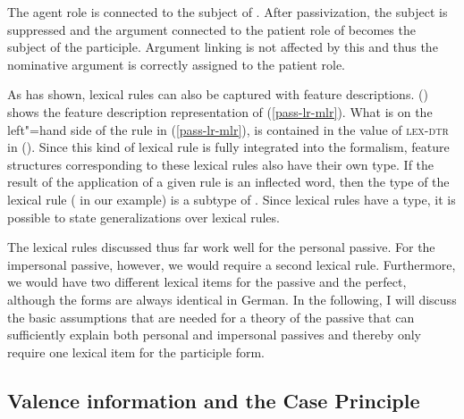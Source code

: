 \zl
The agent role is connected to the subject of . After passivization, the subject is suppressed and the argument connected to
the patient role of  becomes the subject of the participle. Argument linking is not affected by this and thus the nominative argument is
correctly assigned to the patient role.

As \citet{Meurers2001a} has shown, lexical rules can also be captured with feature
descriptions.\label{pageref-lr-mit-dtr} () shows the feature description representation of (\ref{pass-lr-mlr}).
\ea
\label{passiv-lr-mit-dtr}
\z
What is on the left"=hand side of the rule in (\ref{pass-lr-mlr}), is contained in the value of \textsc{lex-dtr} in ().
Since this kind of lexical rule is fully integrated into the formalism, feature structures corresponding to these lexical rules also have their own
type. If the result of the application of a given rule is an inflected word, then the type of the lexical rule ( in our example)
is a subtype of . Since lexical rules have a type, it is possible to state generalizations over lexical rules.

The lexical rules discussed thus far work well for the personal passive. For the impersonal passive,
however, we would require a second lexical rule. Furthermore, we would have two different lexical
items for the passive and the perfect, although the forms are always identical in German.  In the following,
I will discuss the basic assumptions that are needed for a theory of the passive that can sufficiently
explain both personal and impersonal passives and thereby only require one lexical item for the
participle form.

\subsection{Valence information and the Case Principle}
\label{sec-passive-case-principle-hpsg}

